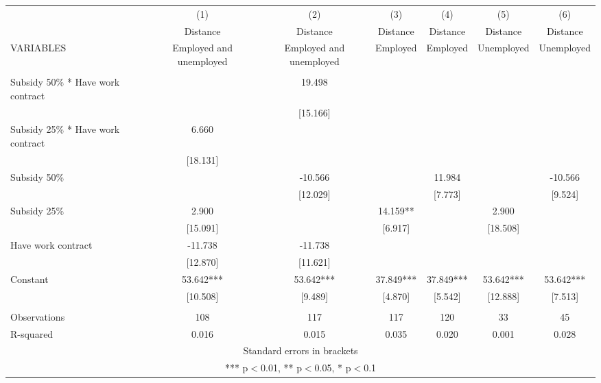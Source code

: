 \begin{tabular}{lcccccc} \hline
 & (1) & (2) & (3) & (4) & (5) & (6) \\
 & Distance & Distance & Distance & Distance & Distance & Distance \\
VARIABLES & Employed and unemployed & Employed and unemployed & Employed & Employed & Unemployed & Unemployed \\ \hline
 &  &  &  &  &  &  \\
Subsidy 50\% * Have work contract &  & 19.498 &  &  &  &  \\
 &  & [15.166] &  &  &  &  \\
Subsidy 25\% * Have work contract & 6.660 &  &  &  &  &  \\
 & [18.131] &  &  &  &  &  \\
Subsidy 50\% &  & -10.566 &  & 11.984 &  & -10.566 \\
 &  & [12.029] &  & [7.773] &  & [9.524] \\
Subsidy 25\% & 2.900 &  & 14.159** &  & 2.900 &  \\
 & [15.091] &  & [6.917] &  & [18.508] &  \\
Have work contract & -11.738 & -11.738 &  &  &  &  \\
 & [12.870] & [11.621] &  &  &  &  \\
Constant & 53.642*** & 53.642*** & 37.849*** & 37.849*** & 53.642*** & 53.642*** \\
 & [10.508] & [9.489] & [4.870] & [5.542] & [12.888] & [7.513] \\
 &  &  &  &  &  &  \\
Observations & 108 & 117 & 117 & 120 & 33 & 45 \\
 R-squared & 0.016 & 0.015 & 0.035 & 0.020 & 0.001 & 0.028 \\ \hline
\multicolumn{7}{c}{ Standard errors in brackets} \\
\multicolumn{7}{c}{ *** p$<$0.01, ** p$<$0.05, * p$<$0.1} \\
\end{tabular}
